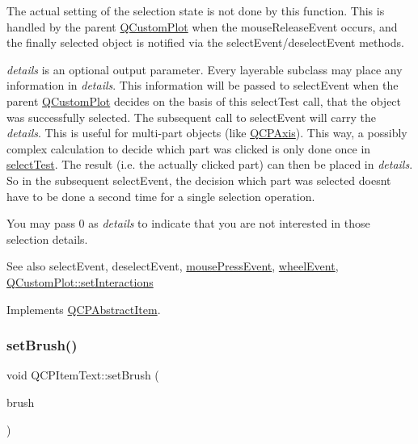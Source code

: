 The actual setting of the selection state is not done by this function. This is handled by the parent \hyperlink{class_q_custom_plot}{Q\+Custom\+Plot} when the mouse\+Release\+Event occurs, and the finally selected object is notified via the select\+Event/deselect\+Event methods.

{\itshape details} is an optional output parameter. Every layerable subclass may place any information in {\itshape details}. This information will be passed to select\+Event when the parent \hyperlink{class_q_custom_plot}{Q\+Custom\+Plot} decides on the basis of this select\+Test call, that the object was successfully selected. The subsequent call to select\+Event will carry the {\itshape details}. This is useful for multi-\/part objects (like \hyperlink{class_q_c_p_axis}{Q\+C\+P\+Axis}). This way, a possibly complex calculation to decide which part was clicked is only done once in \hyperlink{class_q_c_p_item_text_a676aaec10ad3cc4d7d0e4847db04c838}{select\+Test}. The result (i.\+e. the actually clicked part) can then be placed in {\itshape details}. So in the subsequent select\+Event, the decision which part was selected doesn\textquotesingle{}t have to be done a second time for a single selection operation.

You may pass 0 as {\itshape details} to indicate that you are not interested in those selection details.

\begin{DoxySeeAlso}{See also}
select\+Event, deselect\+Event, \hyperlink{class_q_c_p_layerable_af6567604818db90f4fd52822f8bc8376}{mouse\+Press\+Event}, \hyperlink{class_q_c_p_layerable_a47dfd7b8fd99c08ca54e09c362b6f022}{wheel\+Event}, \hyperlink{class_q_custom_plot_a5ee1e2f6ae27419deca53e75907c27e5}{Q\+Custom\+Plot\+::set\+Interactions} 
\end{DoxySeeAlso}


Implements \hyperlink{class_q_c_p_abstract_item_ae41d0349d68bb802c49104afd100ba2a}{Q\+C\+P\+Abstract\+Item}.

\mbox{\label{class_q_c_p_item_text_a1c7e131516df2ed8d941ef31240ded8e}} 
\subsubsection{\texorpdfstring{set\+Brush()}{setBrush()}}
{\footnotesize\ttfamily void Q\+C\+P\+Item\+Text\+::set\+Brush (\begin{DoxyParamCaption}\item[{const Q\+Brush \&}]{brush }\end{DoxyParamCaption})}

